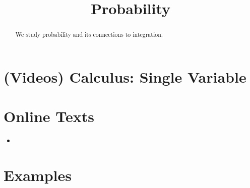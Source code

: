\documentclass{ximera}
\title{Probability}
\begin{document}
\begin{abstract}
  We study probability and its connections to integration.
\end{abstract}
\maketitle

\section*{(Videos) Calculus: Single Variable}

\section*{Online Texts}
\begin{itemize}
\item {}
\end{itemize}

\section*{Examples}

\begin{example}

\end{example}

\begin{example}

\end{example}
\end{document}
